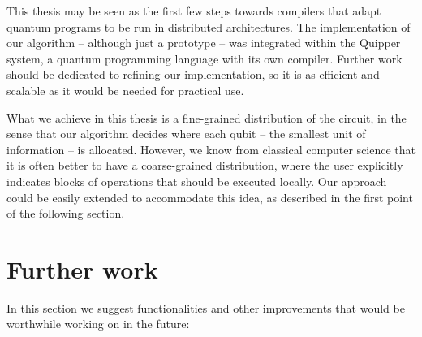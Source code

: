 This thesis may be seen as the first few steps towards compilers that adapt quantum programs to be run in distributed architectures. The implementation of our algorithm -- although just a prototype -- was integrated within the Quipper system, a quantum programming language with its own compiler. Further work should be dedicated to refining our implementation, so it is as efficient and scalable as it would be needed for practical use. 

What we achieve in this thesis is a fine-grained distribution of the circuit, in the sense that our algorithm decides where each qubit -- the smallest unit of information -- is allocated. However, we know from classical computer science that it is often better to have a coarse-grained distribution, where the user explicitly indicates blocks of operations that should be executed locally. Our approach could be easily extended to accommodate this idea, as described in the first point of the following section.

\section{Further work}
\label{FurtherWork}

In this section we suggest functionalities and other improvements that would be worthwhile working on in the future:

